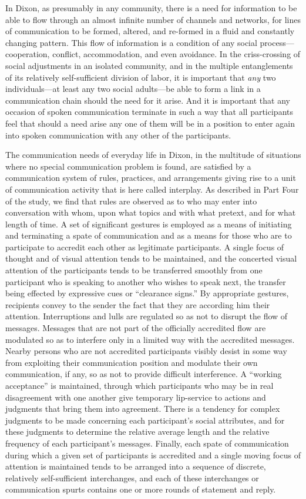 \documentclass[twoside,symmetric,nobib,justified]{tufte-book}
\begin{document}
\newpage In Dixon, as presumably in any community, there is a need for
information to be able to flow through an almost infinite number of
channels and networks, for lines of communication to be formed, altered,
and re-formed in a fluid and constantly changing pattern. This flow of
information is a condition of any social process---cooperation,
conflict, accommodation, and even avoidance. In the criss-crossing of
social adjustments in an isolated community, and in the multiple
entanglements of its relatively self-sufficient division of labor, it is
important that \emph{any} two individuals---at least any two social
adults---be able to form a link in a communication chain should the need
for it arise. And it is important that any occasion of spoken
communication terminate in such a way that all participants feel that
should a need arise any one of them will be in a position to enter again
into spoken communication with any other of the participants.

The communication needs of everyday life in Dixon, in the multitude of
situations where no special communication problem is found, are
satisfied by a communication system of rules, practices, and
arrangements giving rise to a unit of communication activity that is
here called interplay. As described in Part Four of the study, we find
that rules are observed as to who may enter into conversation with whom,
upon what topics and with what pretext, and for what length of time. A
set of significant gestures is employed as a means of initiating and
terminating a spate of communication and as a means for those who are to
participate to accredit each other as legitimate participants. A single
focus of thought and of visual attention tends to be maintained, and the
concerted visual attention of the participants tends to be transferred
smoothly from one participant who is speaking to another who wishes to
speak next, the transfer being effected by expressive cues or
``clearance signs.'' By appropriate gestures, recipients convey to the
sender the fact that they are according him their attention.
Interruptions and lulls are regulated so as not to disrupt the flow of
messages. Messages that are not part of the officially accredited flow
are modulated so as to interfere only in a limited way with the
accredited messages. Nearby persons who are not accredited participants
visibly desist in some way from exploiting their communication position
and modulate their own communication, if any, so as not to provide
difficult interference. A ``working acceptance'' is maintained, through
which participants who may be in real disagreement with one another give
temporary lip-service to actions and judgments that bring them into
agreement. There is a tendency for complex judgments to be made
concerning each participant's social attributes, and for these judgments
to determine the relative average length and the relative frequency of
each participant's messages. Finally, each spate of communication during
which a given set of participants is accredited and a single moving
focus of attention is maintained tends to be arranged into a sequence of
discrete, relatively self-sufficient interchanges, and each of these
interchanges or communication spurts contains one or more rounds of
statement and reply.
\end{document}
